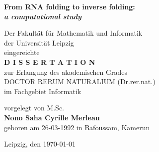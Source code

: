 \thispagestyle{empty}
{\Large
\begin{center}
	\Large \textbf{From RNA folding to  inverse folding:\\
		\textit{a computational study}}
\end{center}}
\vspace*{3.7cm}
\begin{center}
Der Fakult\"at f\"ur Mathematik und Informatik\\
der Universit\"at Leipzig\\
eingereichte\\
\vspace{0.4cm}
\textbf{D I S S E R T A T I O N}\\
zur Erlangung des akademischen Grades\\
DOCTOR RERUM NATURALIUM (Dr.rer.nat.)\\
im Fachgebiet Informatik
\end{center}
\begin{center}
vorgelegt von M.Sc.\\
 \textbf{Nono Saha Cyrille Merleau}\\
geboren am 26-03-1992 \hspace{0em} in Bafoussam, Kamerun
\end{center}
\vspace{5cm}

\begin{center}
Leipzig, den {\today}
\end{center}


